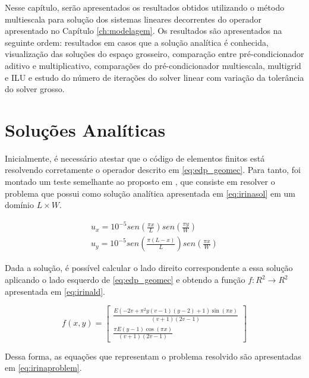 Nesse capítulo, serão apresentados os resultados obtidos utilizando o método multiescala para solução dos sistemas lineares decorrentes do operador apresentado no Capítulo \ref{ch:modelagem}. Os resultados são apresentados na seguinte ordem: resultados em casos que a solução analítica é conhecida, visualização das soluções do espaço grosseiro, comparação entre pré-condicionador aditivo e multiplicativo, comparações do pré-condicionador multiescala, multigrid e ILU e estudo do número de iterações do solver linear com variação da tolerância do solver grosso.

\section{Soluções Analíticas}

Inicialmente, é necessário atestar que o código de elementos finitos está resolvendo corretamente o operador descrito em \eqref{eq:edp_geomec}. Para tanto, foi montado um teste semelhante ao proposto em \cite{irina}, que consiste em resolver o problema que possui como solução analítica apresentada em \eqref{eq:irinasol} em um domínio  $L \times W$.


\begin{equation} \label{eq:irinasol}
  \begin{aligned}
  u_x = 10^{-5} sen(\frac{\pi x}{L}) sen(\frac{\pi y}{W})  \\
  u_y = 10^{-5} sen(\frac{\pi (L-x)}{L}) sen(\frac{\pi x}{W})
  \end{aligned}
\end{equation}

Dada a solução, é possível calcular o lado direito correspondente a essa solução aplicando o lado esquerdo de \eqref{eq:edp_geomec} e obtendo a função $f: R^2 \rightarrow R^2$ apresentada em \eqref{eq:irinald}. 

\begin{equation} \label{eq:irinald}
f(x, y) = 
\left[\begin{matrix}\frac{E \left(- 2 v + \pi^{2} y \left(v - 1\right) \left(y - 2\right) + 1\right) \sin{\left (\pi x \right )}}{\left(v + 1\right) \left(2 v - 1\right)} \\ \frac{\pi E \left(y - 1\right) \cos{\left (\pi x \right )}}{\left(v + 1\right) \left(2 v - 1\right)}\end{matrix}\right]
\end{equation}

Dessa forma, as equações que representam o problema resolvido são apresentadas em \eqref{eq:irinaproblem}. 


